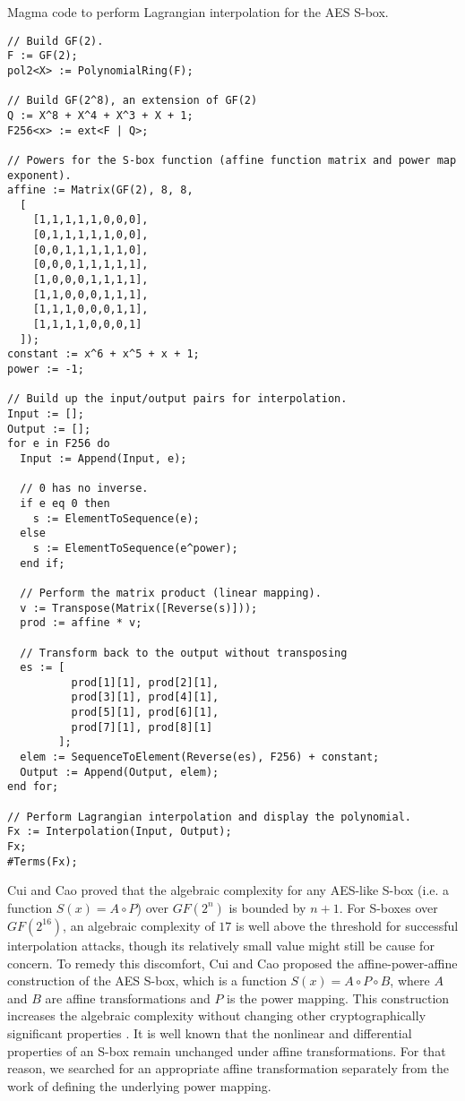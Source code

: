 \begin{listing}[ht!]
\caption{Magma code to perform Lagrangian interpolation for the AES S-box.}
\begin{verbatim}
// Build GF(2).
F := GF(2);
pol2<X> := PolynomialRing(F);

// Build GF(2^8), an extension of GF(2)
Q := X^8 + X^4 + X^3 + X + 1;
F256<x> := ext<F | Q>;

// Powers for the S-box function (affine function matrix and power map exponent).
affine := Matrix(GF(2), 8, 8,
  [
    [1,1,1,1,1,0,0,0],
    [0,1,1,1,1,1,0,0],
    [0,0,1,1,1,1,1,0],
    [0,0,0,1,1,1,1,1],
    [1,0,0,0,1,1,1,1],
    [1,1,0,0,0,1,1,1],
    [1,1,1,0,0,0,1,1],
    [1,1,1,1,0,0,0,1]
  ]);
constant := x^6 + x^5 + x + 1;
power := -1;

// Build up the input/output pairs for interpolation.
Input := [];
Output := [];
for e in F256 do
  Input := Append(Input, e);

  // 0 has no inverse.
  if e eq 0 then
    s := ElementToSequence(e);
  else
    s := ElementToSequence(e^power);
  end if;

  // Perform the matrix product (linear mapping).
  v := Transpose(Matrix([Reverse(s)]));
  prod := affine * v;

  // Transform back to the output without transposing
  es := [
          prod[1][1], prod[2][1], 
          prod[3][1], prod[4][1], 
          prod[5][1], prod[6][1], 
          prod[7][1], prod[8][1]
        ];
  elem := SequenceToElement(Reverse(es), F256) + constant;
  Output := Append(Output, elem);
end for;

// Perform Lagrangian interpolation and display the polynomial.
Fx := Interpolation(Input, Output);
Fx;
#Terms(Fx);
\end{verbatim}
\label{lst:algComplexityMagmaCode}
\end{listing}

Cui and Cao \cite{Cui07-1} proved that the algebraic complexity for any AES-like S-box (i.e. a function $S(x) = A \circ P$) over $GF(2^n)$ is bounded by $n + 1$. For S-boxes over $GF(2^{16})$, an algebraic complexity of $17$ is well above the threshold for successful interpolation attacks, though its relatively small value might still be cause for concern. To remedy this discomfort, Cui and Cao proposed the affine-power-affine construction of the AES S-box, which is a function $S(x) = A \circ P \circ B$, where $A$ and $B$ are affine transformations and $P$ is the power mapping. This construction increases the algebraic complexity without changing other cryptographically significant properties \cite{Cui07-1}. It is well known that the nonlinear and differential properties of an S-box remain unchanged under affine transformations. For that reason, we searched for an appropriate affine transformation separately from the work of defining the underlying power mapping. 


